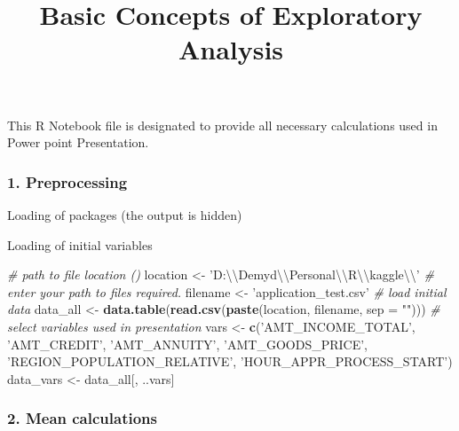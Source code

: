 \documentclass[]{article}
\title{Basic Concepts of Exploratory Analysis}
\author{}
\date{}
\newenvironment{Shaded}{\begin{snugshade}}{\end{snugshade}}
\newcommand{\KeywordTok}[1]{\textcolor[rgb]{0.13,0.29,0.53}{\textbf{#1}}}
\newcommand{\DataTypeTok}[1]{\textcolor[rgb]{0.13,0.29,0.53}{#1}}
\newcommand{\CharTok}[1]{\textcolor[rgb]{0.31,0.60,0.02}{#1}}
\newcommand{\StringTok}[1]{\textcolor[rgb]{0.31,0.60,0.02}{#1}}
\newcommand{\CommentTok}[1]{\textcolor[rgb]{0.56,0.35,0.01}{\textit{#1}}}
\newcommand{\NormalTok}[1]{#1}
\begin{document}
\maketitle

This R Notebook file is designated to provide all necessary calculations
used in Power point Presentation.

\subsubsection{1. Preprocessing}\label{preprocessing}

Loading of packages (the output is hidden)

Loading of initial variables

\begin{Shaded}
\begin{Highlighting}[]
\CommentTok{# path to file location ()}
\NormalTok{location <-}\StringTok{ 'D:}\CharTok{\textbackslash{}\textbackslash{}}\StringTok{Demyd}\CharTok{\textbackslash{}\textbackslash{}}\StringTok{Personal}\CharTok{\textbackslash{}\textbackslash{}}\StringTok{R}\CharTok{\textbackslash{}\textbackslash{}}\StringTok{kaggle}\CharTok{\textbackslash{}\textbackslash{}}\StringTok{'} \CommentTok{# enter your path to files required. }
\NormalTok{filename <-}\StringTok{ 'application_test.csv'}
\CommentTok{# load initial data}
\NormalTok{data_all <-}\StringTok{ }\KeywordTok{data.table}\NormalTok{(}\KeywordTok{read.csv}\NormalTok{(}\KeywordTok{paste}\NormalTok{(location, filename, }\DataTypeTok{sep =} \StringTok{""}\NormalTok{)))}
\CommentTok{# select variables used in presentation}
\NormalTok{vars <-}\StringTok{ }\KeywordTok{c}\NormalTok{(}\StringTok{'AMT_INCOME_TOTAL'}\NormalTok{,   }\StringTok{'AMT_CREDIT'}\NormalTok{,   }\StringTok{'AMT_ANNUITY'}\NormalTok{,  }\StringTok{'AMT_GOODS_PRICE'}\NormalTok{,  }\StringTok{'REGION_POPULATION_RELATIVE'}\NormalTok{, }\StringTok{'HOUR_APPR_PROCESS_START'}\NormalTok{)}
\NormalTok{data_vars <-}\StringTok{ }\NormalTok{data_all[, ..vars]}
\end{Highlighting}
\end{Shaded}

\subsubsection{2. Mean calculations}\label{mean-calculations}
\end{document}
